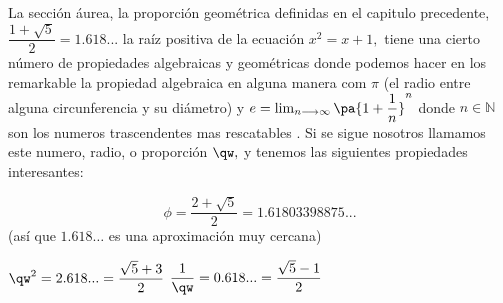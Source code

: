  La sección áurea, la proporción geométrica definidas en el capitulo precedente, $\dfrac{1+\sqrt{5}}{2}=1.618...$ la raíz positiva de la ecuación $x^2=x+1,$ tiene una cierto número de propiedades  algebraicas  y geométricas   donde podemos hacer en los remarkable la propiedad algebraica  en alguna manera  com $\pi$ (el radio entre alguna circunferencia y su diámetro) y $e=\lim_{n\longrightarrow \infty}\pa{1+\dfrac{1}{n}}^n$ donde $n\in \mathbb{N}$ son los numeros trascendentes  mas rescatables  .
  Si  se sigue nosotros llamamos este numero, radio, o proporción $\qw,$  y tenemos las siguientes propiedades interesantes:

  $$\phi=\frac{2+\sqrt{5}}{2}=1.61803398875...$$
  (así que $1.618\ldots $ es una aproximación  muy cercana)

  $\qw^2=2.618...=\dfrac{\sqrt{5}+3}{2}$
   $\dfrac{1}{\qw}=0.618...=\dfrac{\sqrt{5}-1}{2}$

